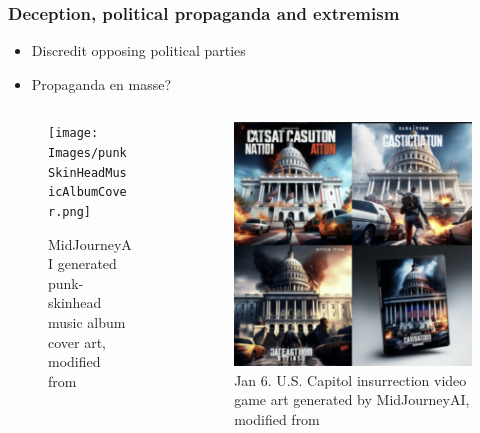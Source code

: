 \documentclass[
	11pt, compress%
]{beamer}
\begin{document}

\begin{frame}

	\frametitle{Deception, political propaganda and extremism}
	\begin{itemize}
		\setlength\itemsep{1em}
		\item Discredit opposing political parties
		\item Propaganda en masse?
	\end{itemize}
	\begin{columns}[c] 
		\begin{column}{0.5\textwidth} %
			\begin{figure}
				\texttt{[image: Images/punkSkinHeadMusicAlbumCover.png]}
				\caption{\tiny MidJourneyAI generated punk-skinhead music album cover art, modified from \cite{AIPropaganda}}
			\end{figure}
		\end{column}
		\begin{column}{0.5\textwidth} %
			\begin{figure}
				\includegraphics[width=0.6\linewidth]{Images/GameCoverArtCapitolInsurrection.png}
				\caption{\tiny Jan 6. U.S. Capitol insurrection video game art generated by MidJourneyAI, modified from \cite{AIPropaganda}} 
			\end{figure}
		\end{column}
	\end{columns}


\end{frame}
\end{document}
